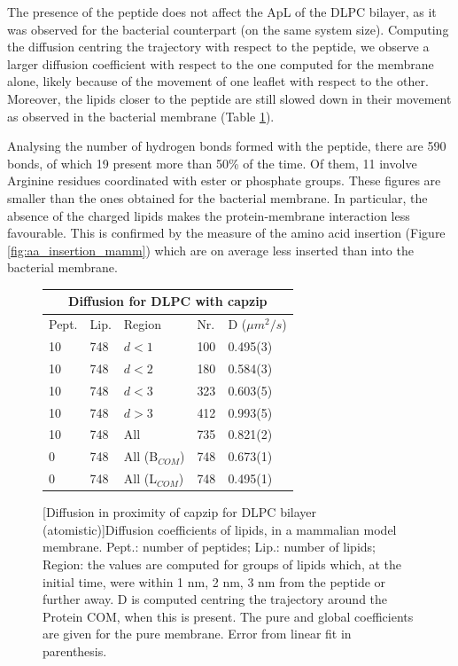 The presence of the peptide does not affect the ApL of the DLPC bilayer, as it was observed for the bacterial counterpart (on the same system size). Computing the diffusion centring the trajectory with respect to the peptide, we observe a larger diffusion coefficient with respect to the one computed for the membrane alone, likely because of the movement of one leaflet with respect to the other. Moreover, the lipids closer to the peptide are still slowed down in their movement as observed in the bacterial membrane (Table \ref{table:dlpc_D_space}).

Analysing the number of hydrogen bonds formed with the peptide, there are 590 bonds, of which 19 present more than 50\% of the time. Of them, 11 involve Arginine residues coordinated with ester or phosphate groups. These figures are smaller than the ones obtained for the bacterial membrane. In particular, the absence of the charged lipids makes the protein-membrane interaction less favourable. This is confirmed by the measure of the amino acid insertion (Figure \ref{fig:aa_insertion_mamm}) which are on average less inserted than into the bacterial membrane.

\begin{figure}[t!]
\centering
 \def\arraystretch{1.6}
\begin{tabular}{lllll}
 \multicolumn{5}{c}{\textbf{Diffusion for DLPC with capzip}} \\
 \hline
Pept. & Lip. & Region & Nr. & D ($\mu m^2/s$) \\
 \hline
10 & 748 & $d<1$ & 100 & 0.495(3) \\
10 & 748 & $d<2$ & 180 & 0.584(3) \\
10 & 748 & $d<3$ & 323 & 0.603(5) \\
10 & 748 & $d>3$ & 412 & 0.993(5) \\
10 & 748 & All & 735 & 0.821(2) \\
 \hline
 0 & 748 & All (B$_{COM}$) & 748 & 0.673(1) \\
 0 & 748 & All (L$_{COM}$) & 748 & 0.495(1) \\
 \hline
 \end{tabular}
[Diffusion in proximity of capzip for DLPC bilayer (atomistic)]{Diffusion coefficients of lipids, in a mammalian model membrane. Pept.: number of peptides; Lip.: number of lipids; Region: the values are computed for groups of lipids which, at the initial time, were within 1 nm, 2 nm, 3 nm from the peptide or further away. D is computed centring the trajectory around the Protein COM, when this is present. The pure and global coefficients are given for the pure membrane. Error from linear fit in parenthesis.}
\label{table:dlpc_D_space}
\end{figure}

